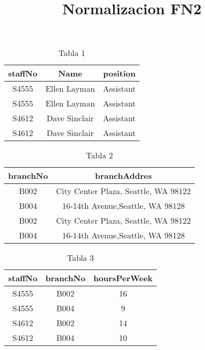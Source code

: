 \documentclass[letterpaper,12pt]{article}
\title{\textbf{Normalizacion FN2}}
\begin{document}
\maketitle

    \begin{table}[h!]
        \begin{center}
        \begin{tabular}{|c|c|c|}
        \hline
        \textbf{staffNo}&\textbf{Name}&\textbf{position}\\
        \hline

        S4555 & Ellen Layman & Assistant\\\hline
        S4555 & Ellen Layman & Assistant\\\hline
        S4612 & Dave Sinclair & Assistant\\\hline
        S4612 & Dave Sinclair & Assistant\\
        \hline
        \end{tabular}
        \end{center}
    \caption{Tabla 1}
    \end{table}
   
   \begin{table}[h!]
        \begin{center}
        \begin{tabular}{|c|c|}
        \hline
        \textbf{branchNo }&\textbf{ branchAddres}\\
        \hline
        B002 & City Center Plaza, Seattle, WA 98122\\\hline
        B004 & 16-14th Avenue,Seattle, WA 98128\\\hline
        B002 & City Center Plaza, Seattle, WA 98122\\\hline
        B004 & 16-14th Avenue,Seattle, WA 98128\\\hline
        
        \end{tabular}
        \end{center}
        \caption{Tabla 2}
    \end{table}
    
    \begin{table}[h!]
        \begin{center}
        \begin{tabular}{|c|c|c|}
        \hline
        \textbf{staffNo }&\textbf{ branchNo}&\textbf{hoursPerWeek}\\
        \hline
        S4555 & B002 &  16\\\hline
        S4555 & B004 & 9\\\hline
        S4612 & B002 & 14\\\hline
        S4612 & B004 & 10\\\hline
        
        \end{tabular}
        \end{center}
        \caption{Tabla 3}
    \end{table}
\end{document}

